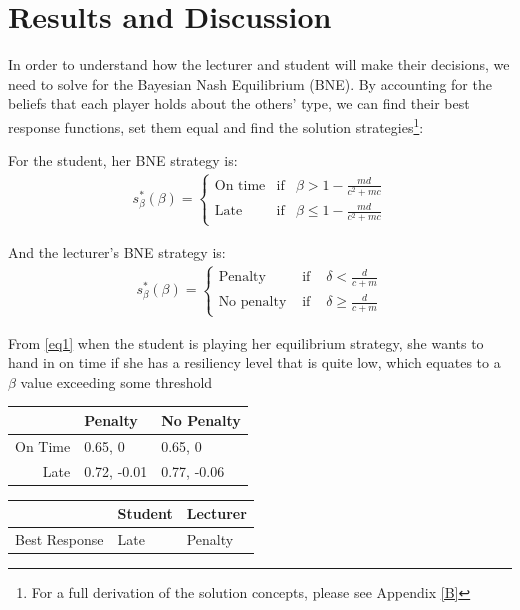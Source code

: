\documentclass[11pt,preprint, authoryear]{elsarticle}
\let\origtable\table
\let\endorigtable\endtable
\renewenvironment{table}[1][2] {
    \expandafter\origtable\expandafter[H]
} {
    \endorigtable
}
\numberwithin{equation}{section}
\numberwithin{figure}{section}
\numberwithin{table}{section}
\let\rmarkdownfootnote\footnote%
\def\footnote{\protect\rmarkdownfootnote}
\begin{document}
\hypertarget{results-and-discussion}{%
\section{\texorpdfstring{Results and Discussion
\label{result}}{Results and Discussion }}\label{results-and-discussion}}

In order to understand how the lecturer and student will make their
decisions, we need to solve for the Bayesian Nash Equilibrium (BNE). By
accounting for the beliefs that each player holds about the others'
type, we can find their best response functions, set them equal and find
the solution strategies\footnote{For a full derivation of the solution
  concepts, please see Appendix \ref{B}}:

For the student, her BNE strategy is: \begin{align*}
s_{\beta}^{*}(\beta)=\left\{\begin{array}{lll}
\text{On time} & \text{if} & \beta>1-\frac{m d}{c^{2}+m c}  \\
\text{Late} & \text{if} & \beta \leqslant 1-\frac{m d}{c^{2}+m c} 
\end{array}\right.
\end{align*}

And the lecturer's BNE strategy is: \begin{align*}
s_{\beta}^{*}(\beta)=\left\{\begin{array}{lll}
\text{Penalty} & \text { if } & \delta<\frac{d}{c+m} \\
\text{No penalty} & \text { if } & \delta \geq \frac{d}{c+m} \label{eq2}
\end{array}\right.
\end{align*}

From \ref{eq1} when the student is playing her equilibrium strategy, she
wants to hand in on time if she has a resiliency level that is quite
low, which equates to a \(\beta\) value exceeding some threshold

\begin{table}[H]
\centering
\begin{tabular}{rll}
  \toprule
 & Penalty & No Penalty \\ 
  \midrule
On Time & 0.65, 0 & 0.65, 0 \\ 
  Late & 0.72, -0.01 & 0.77, -0.06 \\ 
   \bottomrule
\end{tabular}
\caption{Simultaneous Game Best Response \label{tab2}} 
\end{table}
\begin{table}[H]
\centering
\begin{tabular}{rll}
  \toprule
 & Student & Lecturer \\ 
  \midrule
Best Response & Late & Penalty \\ 
   \bottomrule
\end{tabular}
\caption{Best Response\label{tab3}} 
\end{table}
\end{document}
